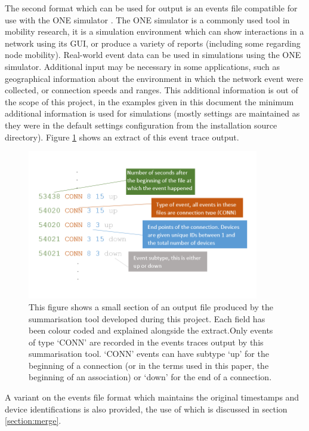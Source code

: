 The second format which can be used for output is an events file compatible for use with the ONE simulator \cite{Keranen2009}. The ONE simulator is a commonly used tool in mobility research, it is a simulation environment which can show interactions in a network using its GUI, or produce a variety of reports (including some regarding node mobility). Real-world event data can be used in simulations using the ONE simulator. Additional input may be necessary in some applications, such as geographical information about the environment in which the network event were collected, or connection speeds and ranges. This additional information is out of the scope of this project, in the examples given in this document the minimum additional information is used for simulations (mostly settings are maintained as they were in the default settings configuration from the installation source directory). Figure \ref{fig:events_out} shows an extract of this event trace output.
\begin{figure}[h]
    \centerline{\includegraphics[width=0.9\textwidth]{events_output.png}}
    \caption{This figure shows a small section of an output file produced by the summarisation tool developed during this project. Each field has been colour coded and explained alongside the extract.Only events of type `CONN' are recorded in the events traces output by this summarisation tool. `CONN' events can have subtype `up' for the beginning of a connection (or in the terms used in this paper, the beginning of an association) or `down' for the end of a connection.}
    \label{fig:events_out}
\end{figure}

A variant on the events file format which maintains the original timestamps and device identifications is also provided, the use of which is discussed in section \ref{section:merge}.

